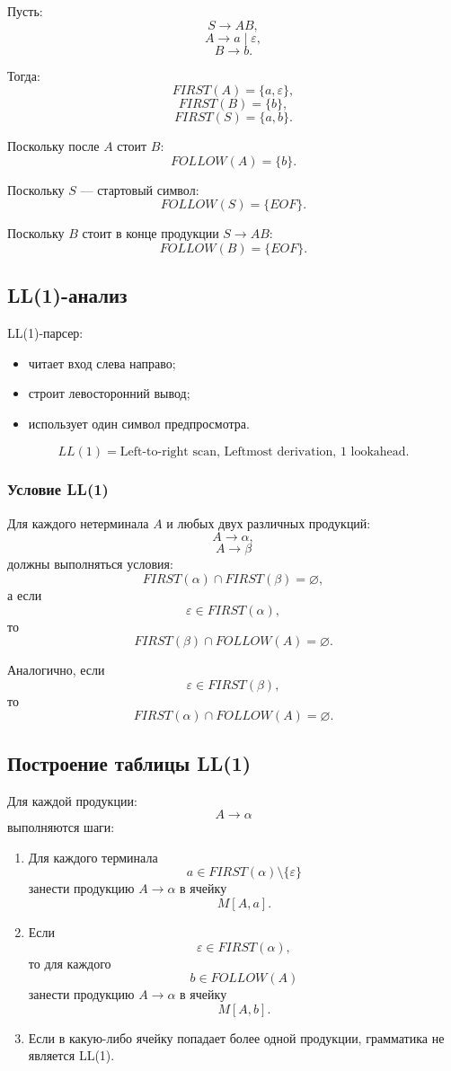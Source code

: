 \documentclass[12pt,a4paper]{article}
\theoremstyle{definition}
\theoremstyle{plain}
\begin{document}
Пусть:
\[
S\to AB,
\]
\[
A\to a \mid \varepsilon,
\]
\[
B\to b.
\]

Тогда:
\[
FIRST(A)=\{a,\varepsilon\},
\]
\[
FIRST(B)=\{b\},
\]
\[
FIRST(S)=\{a,b\}.
\]

Поскольку после $A$ стоит $B$:
\[
FOLLOW(A)=\{b\}.
\]

Поскольку $S$ --- стартовый символ:
\[
FOLLOW(S)=\{EOF\}.
\]

Поскольку $B$ стоит в конце продукции $S\to AB$:
\[
FOLLOW(B)=\{EOF\}.
\]

\subsection{LL(1)-анализ}

LL(1)-парсер:
\begin{itemize}
    \item читает вход слева направо;
    \item строит левосторонний вывод;
    \item использует один символ предпросмотра.
\end{itemize}

\[
LL(1)=
\text{Left-to-right scan, Leftmost derivation, 1 lookahead}.
\]

\subsubsection*{Условие LL(1)}

Для каждого нетерминала $A$ и любых двух различных продукций:
\[
A\to \alpha,
\]
\[
A\to \beta
\]
должны выполняться условия:
\[
FIRST(\alpha)\cap FIRST(\beta)=\varnothing,
\]
а если
\[
\varepsilon\in FIRST(\alpha),
\]
то
\[
FIRST(\beta)\cap FOLLOW(A)=\varnothing.
\]

Аналогично, если
\[
\varepsilon\in FIRST(\beta),
\]
то
\[
FIRST(\alpha)\cap FOLLOW(A)=\varnothing.
\]

\subsection{Построение таблицы LL(1)}

Для каждой продукции:
\[
A\to \alpha
\]
выполняются шаги:

\begin{enumerate}
    \item Для каждого терминала
    \[
    a\in FIRST(\alpha)\setminus\{\varepsilon\}
    \]
    занести продукцию $A\to\alpha$ в ячейку
    \[
    M[A,a].
    \]
    \item Если
    \[
    \varepsilon\in FIRST(\alpha),
    \]
    то для каждого
    \[
    b\in FOLLOW(A)
    \]
    занести продукцию $A\to\alpha$ в ячейку
    \[
    M[A,b].
    \]
    \item Если в какую-либо ячейку попадает более одной продукции, грамматика не является LL(1).
\end{enumerate}
\end{document}
